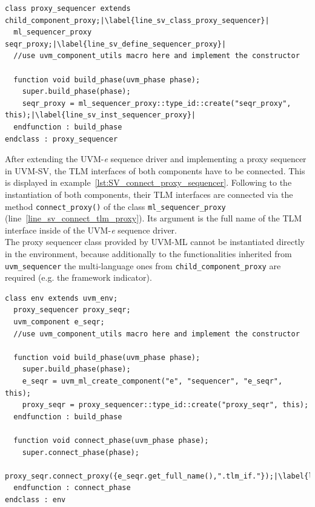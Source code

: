 \lstset{language=SystemVerilog, numbers = left, escapechar=|, breaklines=true}
\begin{lstlisting}[frame=htrbl, caption={SystemVerilog: creating a proxy sequencer},
label={lst:SV_proxy_sequencer}]
class proxy_sequencer extends child_component_proxy;|\label{line_sv_class_proxy_sequencer}|
  ml_sequencer_proxy seqr_proxy;|\label{line_sv_define_sequencer_proxy}|
  //use uvm_component_utils macro here and implement the constructor
  
  function void build_phase(uvm_phase phase);
    super.build_phase(phase);
    seqr_proxy = ml_sequencer_proxy::type_id::create("seqr_proxy", this);|\label{line_sv_inst_sequencer_proxy}|
  endfunction : build_phase
endclass : proxy_sequencer
\end{lstlisting}
After extending the UVM-\textit{e} sequence driver and implementing a proxy sequencer in UVM-SV, the TLM interfaces of both components have to be connected. This is displayed in example~\ref{lst:SV_connect_proxy_sequencer}. Following to the instantiation of both components, their TLM interfaces are connected via the method \lstinline$connect_proxy()$ of the class \lstinline$ml_sequencer_proxy$ (line~\ref{line_sv_connect_tlm_proxy}). Its argument is the full name of the TLM interface inside of the UVM-\textit{e} sequence driver.\\
The proxy sequencer class provided by UVM-ML cannot be instantiated directly in the environment, because additionally to the functionalities inherited from \lstinline$uvm_sequencer$ the multi-language ones from \lstinline$child_component_proxy$ are required (e.g. the framework indicator).
\lstset{language=SystemVerilog, numbers = left, escapechar=|, breaklines=true}
\begin{lstlisting}[frame=htrbl, caption={SystemVerilog: connecting proxy sequencer and foreign sequencer},
label={lst:SV_connect_proxy_sequencer}]
class env extends uvm_env;
  proxy_sequencer proxy_seqr;
  uvm_component e_seqr;
  //use uvm_component_utils macro here and implement the constructor
  
  function void build_phase(uvm_phase phase);
    super.build_phase(phase);
    e_seqr = uvm_ml_create_component("e", "sequencer", "e_seqr", this);
    proxy_seqr = proxy_sequencer::type_id::create("proxy_seqr", this);
  endfunction : build_phase
  
  function void connect_phase(uvm_phase phase);
    super.connect_phase(phase);
    proxy_seqr.connect_proxy({e_seqr.get_full_name(),".tlm_if."});|\label{line_sv_connect_tlm_proxy}|
  endfunction : connect_phase
endclass : env
\end{lstlisting}
